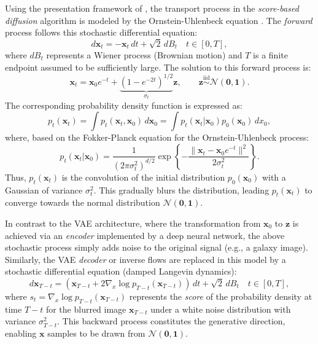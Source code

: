 \documentclass[fleqn,usenatbib]{mnras}
\begin{document}
{\color{red}Using the presentation framework of \cite{guth2022wavelet}}, the transport process in the \textit{score-based diffusion} algorithm is modeled by the Ornstein-Uhlenbeck equation \citep{Uhlenbeck1930}. The \textit{forward} process follows this stochastic differential equation:
\begin{equation}
d\bm{x}_t = -\bm{x}_t \, dt + \sqrt{2}\, dB_t \quad t\in[0,T],
\label{eq-Ornstein-cont}
\end{equation}
where $dB_t$ represents a Wiener process (Brownian motion) and $T$ is a finite endpoint assumed to be sufficiently large. The solution to this forward process is:
\begin{equation}
\bm{x}_t = \bm{x}_0 e^{-t} + \underbrace{(1-e^{-2t})^{1/2}}_{\sigma_t} \bm{z}, \qquad \bm{z} \overset{\text{iid}}{\sim} \mathcal{N}(\bm{0},\bm{1}).
\end{equation}
The corresponding probability density function is expressed as:
\begin{equation}
p_t(\bm{x}_t) = \int p_t(\bm{x}_t,\bm{x}_0) \, d\bm{x}_0 = \int p_t(\bm{x}_t|\bm{x}_0) p_0(\bm{x}_0) \, dx_0,
\label{eq-smoothing-p0-gauss}
\end{equation}
where, based on the Fokker-Planck equation for the Ornstein-Uhlenbeck process:
\begin{equation}
p_t(\bm{x}_t|\bm{x}_0) = \frac{1}{(2\pi \sigma_t^2)^{d/2}} \exp\left\{-\frac{\|\bm{x}_t-\bm{x}_0 e^{-t}\|^2}{2\sigma_t^2}\right\}.
\end{equation}
Thus, $p_t(\bm{x}_t)$ is the convolution of the initial distribution $p_0(\bm{x}_0)$ with a Gaussian of variance $\sigma_t^2$. This gradually blurs the distribution, leading $p_t(\bm{x}_t)$ to converge towards the normal distribution $\mathcal{N}(\bm{0},\bm{1})$.

In contrast to the VAE architecture, where the transformation from $\bm{x}_0$ to $\bm{z}$ is achieved via an \textit{encoder} implemented by a deep neural network, the above stochastic process simply adds noise to the original signal (e.g., a galaxy image). Similarly, the VAE \textit{decoder} or inverse flows are replaced in this model by a stochastic differential equation (damped Langevin dynamics):
\begin{equation}
d\bm{x}_{T-t} = (\bm{x}_{T-t} + 2 \nabla_x \log p_{T-t}(\bm{x}_{T-t}))\, dt + \sqrt{2}\, dB_t \quad t\in[0,T],
\label{eq-backward-diffusion}
\end{equation}
where $s_t = \nabla_x \log p_{T-t}(\bm{x}_{T-t})$ represents the \textit{score} of the probability density at time $T-t$ for the blurred image $\bm{x}_{T-t}$ under a white noise distribution with variance $\sigma_{T-t}^2$. This backward process constitutes the generative direction, enabling $\bm{x}$ samples to be drawn from $\mathcal{N}(\bm{0},\bm{1})$.
\end{document}
